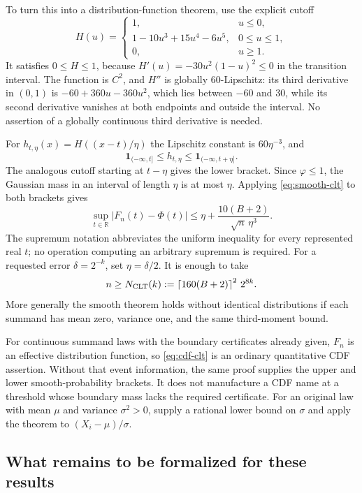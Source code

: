 To turn this into a distribution-function theorem, use the explicit cutoff
\[
 H(u)=\begin{cases}
 1,&u\leq0,\\
 1-10u^3+15u^4-6u^5,&0\leq u\leq1,\\
 0,&u\geq1.
 \end{cases}
\]
It satisfies $0\leq H\leq1$, because
$H'(u)=-30u^2(1-u)^2\leq0$ in the transition interval.
The function is $C^2$, and $H''$ is globally $60$-Lipschitz: its third
derivative in $(0,1)$ is $-60+360u-360u^2$, which lies between $-60$ and
$30$, while its second derivative vanishes at both endpoints and outside
the interval.  No assertion of a globally continuous third derivative is
needed.

For $h_{t,\eta}(x)=H((x-t)/\eta)$ the Lipschitz constant is $60\eta^{-3}$,
and
\[
 \mathbf1_{(-\infty,t]}\leq h_{t,\eta}
 \leq\mathbf1_{(-\infty,t+\eta]}.
\]
The analogous cutoff starting at $t-\eta$ gives the lower bracket.  Since
$\varphi\leq1$, the Gaussian mass in an interval of length $\eta$ is at most
$\eta$.  Applying \eqref{eq:smooth-clt} to both brackets gives
\begin{equation}
 \sup_{t\in\mathbb R}|F_n(t)-\Phi(t)|
 \leq\eta+\frac{10(B+2)}{\sqrt n\,\eta^3}.
 \label{eq:cdf-clt}
\end{equation}
The supremum notation abbreviates the uniform inequality for every
represented real $t$; no operation computing an arbitrary supremum is
required.  For a requested error $\delta=2^{-k}$, set $\eta=\delta/2$.  It is
enough to take
\begin{equation}
 n\geq N_{\rm CLT}(k)
 :=\left\lceil160(B+2)\right\rceil^2\,2^{8k}.
 \label{eq:clt-rate}
\end{equation}
More generally the smooth theorem holds without identical distributions if
each summand has mean zero, variance one, and the same third-moment bound.

For continuous summand laws with the boundary certificates already given,
$F_n$ is an effective distribution function, so \eqref{eq:cdf-clt} is an
ordinary quantitative CDF assertion.  Without that event information, the
same proof supplies the upper and lower smooth-probability brackets.  It
does not manufacture a CDF name at a threshold whose boundary mass lacks the
required certificate.  For an original
law with mean $\mu$ and variance $\sigma^2>0$, supply a rational lower bound
on $\sigma$ and apply the theorem to $(X_i-\mu)/\sigma$.

\subsection{What remains to be formalized for these results}

